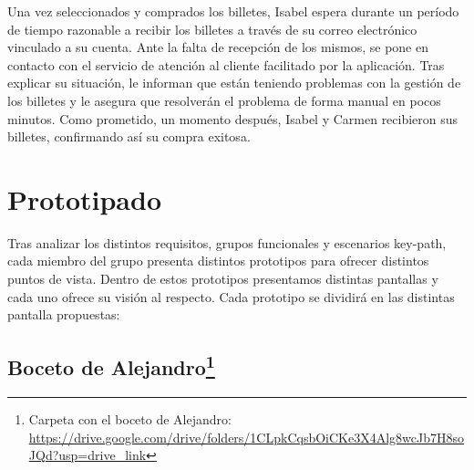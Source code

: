 Una vez seleccionados y comprados los billetes, Isabel espera durante un período de tiempo razonable a recibir los billetes a través de su correo electrónico vinculado a su cuenta. Ante la falta de recepción de los mismos, se pone en contacto con el servicio de atención al cliente facilitado por la aplicación. Tras explicar su situación, le informan que están teniendo problemas con la gestión de los billetes y le asegura que resolverán el problema de forma manual en pocos minutos. 
Como prometido, un momento después, Isabel y Carmen recibieron sus billetes, confirmando así su compra exitosa.

\section{Prototipado}

Tras analizar los distintos requisitos, grupos funcionales y escenarios key-path, cada miembro del grupo presenta distintos prototipos para ofrecer distintos puntos de vista. Dentro de estos prototipos presentamos distintas pantallas y cada uno ofrece su visión al respecto. Cada prototipo se dividirá en las distintas pantalla propuestas:

\subsection[Boceto de Alejandro]{Boceto de Alejandro\footnote{Carpeta con el boceto de Alejandro: \url{https://drive.google.com/drive/folders/1CLpkCqsbOiCKe3X4Alg8wcJb7H8soJQd?usp=drive_link}}}

